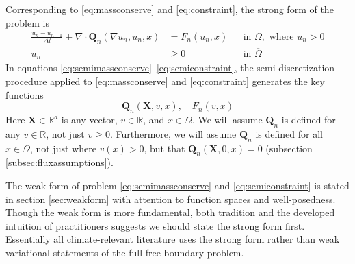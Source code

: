 \documentclass[final,leqno,onefignum,onetabnum]{siamltex1213bueler}
\newcommand\bQ{\mathbf{Q}}
\newcommand\bX{\mathbf{X}}
\newcommand{\Div}{\nabla\cdot}
\renewcommand{\grad}{\nabla}
\newcommand\RR{\mathbb{R}}
\begin{document}
Corresponding to \eqref{eq:massconserve} and \eqref{eq:constraint}, the strong form of the problem is
\begin{align}
\frac{u_n - u_{n-1}}{\Delta t} + \Div \bQ_n(\grad u_n,u_n,x) &= F_n(u_n,x) &&\text{in } \Omega, \text{ where } u_n > 0 \label{eq:semimassconserve} \\
u_n &\ge 0 &&\text{in } \overline{\Omega} \label{eq:semiconstraint}
\end{align}
In equations \eqref{eq:semimassconserve}--\eqref{eq:semiconstraint}, the semi-discretization procedure applied to \eqref{eq:massconserve} and \eqref{eq:constraint} generates the key functions
\begin{equation}
\bQ_n(\bX,v,x), \quad F_n(v,x) \label{eq:functionalforms}
\end{equation}
Here $\bX\in\RR^d$ is any vector, $v\in\RR$, and $x\in \Omega$.  We will assume $\bQ_n$ is defined for any $v\in\RR$, not just $v\ge 0$.  Furthermore, we will assume $\bQ_n$ is defined for all $x\in\Omega$, not just where $v(x)>0$, but that $\bQ_n(\bX,0,x)=0$ (subsection \ref{subsec:fluxassumptions}).

The weak form of problem \eqref{eq:semimassconserve} and \eqref{eq:semiconstraint} is stated in section \ref{sec:weakform} with attention to function spaces and well-posedness.  Though the weak form is more fundamental, both tradition and the developed intuition of practitioners suggests we should state the strong form first.  Essentially all climate-relevant literature uses the strong form rather than weak variational statements of the full free-boundary problem.
\end{document}
